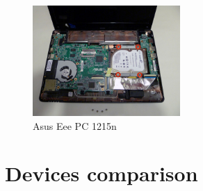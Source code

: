 \documentclass[printmode]{mgr}
\begin{document}
\begin{figure}[htbp]
  \centering
    \includegraphics[width=0.5\textwidth]{1215n-front.jpg}
  \caption{Asus Eee PC 1215n}
  \label{fig:devboard-1215n}
\end{figure}






%





\section{Devices comparison}
\end{document}
